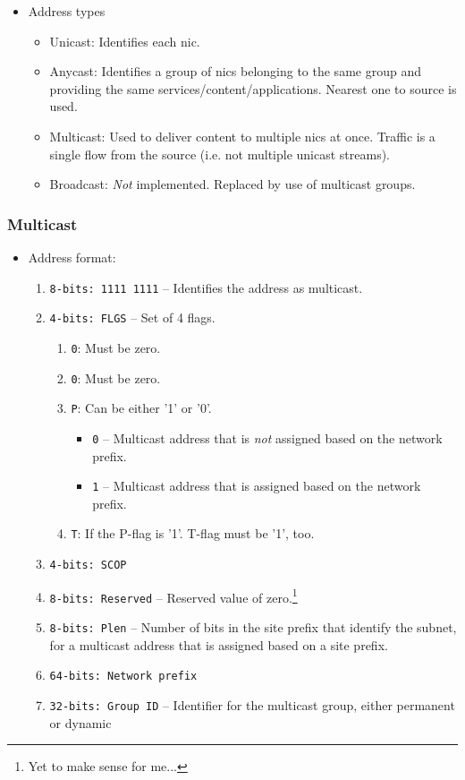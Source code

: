\begin{itemize}
    \item Address types
    \begin{itemize}
        \item Unicast: Identifies each \gls{nic}.
        \item Anycast: Identifies a group of \glspl{nic} belonging to the same group and providing the same services/content/applications. Nearest one to source is used.
        \item Multicast: Used to deliver content to multiple \glspl{nic} at once. Traffic is a single flow from the source (i.e. not multiple unicast streams).
        \item Broadcast: \textit{Not} implemented. Replaced by use of multicast groups.
    \end{itemize}
\end{itemize}

\subsubsection{Multicast}

\begin{itemize}
    \item Address format:\cite{IPv6Addr96:online}
    \begin{enumerate}
        \item \texttt{8-bits: 1111 1111} -- Identifies the address as multicast.
        \item \texttt{4-bits: FLGS} -- Set of 4 flags.
        \begin{enumerate}
            \item \texttt{0}: Must be zero.
            \item \texttt{0}: Must be zero.
            \item \texttt{P}: Can be either '1' or '0'.
            \begin{itemize}
                \item \texttt{0} -- Multicast address that is \textit{not} assigned based on the network prefix.
                \item \texttt{1} -- Multicast address that is assigned based on the network prefix.
            \end{itemize}
            \item \texttt{T}: If the P-flag is '1'. T-flag must be '1', too.
        \end{enumerate}
        \item \texttt{4-bits: SCOP}
        \item \texttt{8-bits: Reserved} -- Reserved value of zero.\footnote{Yet to make sense for me...}
        \item \texttt{8-bits: Plen} -- Number of bits in the site prefix that identify the subnet, for a multicast address that is assigned based on a site prefix.
        \item \texttt{64-bits: Network prefix}
        \item \texttt{32-bits: Group ID} -- Identifier for the multicast group, either permanent or dynamic
    \end{enumerate}
\end{itemize}

